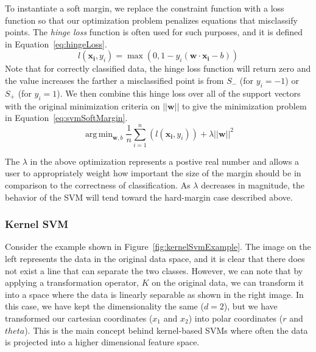 \documentclass[12pt]{article}
\DeclareMathOperator*{\argmin}{arg\,min}
\begin{document}
To instantiate a soft margin, we replace the constraint function with a loss
function so that our optimization problem penalizes equations that misclassify
points.
%
The \emph{hinge loss} function is often used for such purposes, and it is
defined in Equation~\ref{eq:hingeLoss}.
%
\begin{equation}
l(\mathbf{x_i},y_i) = \max(0,1-y_i(\mathbf{w} \cdot \mathbf{x_i} - b))
\label{eq:hingeLoss}
\end{equation}
%
Note that for correctly classified data, the hinge loss function will return
zero and the value increases the farther a misclassified point is from $S_-$
(for $y_i=-1$) or $S_+$ (for $y_i=1$).
%
We then combine this hinge loss over all of the support vectors with the
original minimization criteria on $||\mathbf{w}||$ to give the minimization
problem in Equation~\ref{eq:svmSoftMargin}.
\begin{equation}
\argmin_{\mathbf{w},b}\frac{1}{n}\sum_{i=1}^n \left(l(\mathbf{x_i},y_i)\right) +
\lambda ||\mathbf{w}||^2
\label{eq:svmSoftMargin}
\end{equation}

The $\lambda$ in the above optimization represents a postive real number and
allows a user to appropriately weight how important the size of the margin
should be in comparison to the correctness of classification.
%
As $\lambda$ decreases in magnitude, the behavior of the SVM will tend toward
the hard-margin case described above.

\subsubsection{Kernel SVM}

Consider the example shown in Figure~\ref{fig:kernelSvmExample}.
%
The image on the left represents the data in the original data space, and it is
clear that there does not exist a line that can separate the two classes.
%
However, we can note that by applying a transformation operator, $K$ on the
original data, we can transform it into a space where the data is linearly
separable as shown in the right image.
%
In this case, we have kept the dimensionality the same ($d=2$), but we have
transformed our cartesian coordinates ($x_1$ and $x_2$) into polar coordinates
($r$ and $theta$).
%
This is the main concept behind kernel-based SVMs where often the data is
projected into a higher dimensional feature space.
\end{document}
